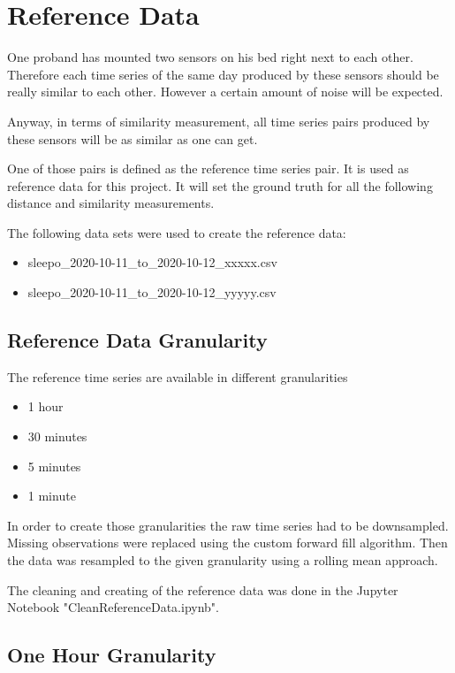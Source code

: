 \chapter{Reference Data}

One proband has mounted two sensors on his bed right next to each other. Therefore each time series of the same day produced by these sensors should be really similar to each other. However a certain amount of noise will be expected. 

Anyway, in terms of similarity measurement, all time series pairs produced by these sensors will be as similar as one can get.

One of those pairs is defined as the reference time series pair. It is used as reference data for this project. It will set the ground truth for all the following distance and similarity measurements.

The following data sets were used to create the reference data:

\begin{itemize}
  \item sleepo\_2020-10-11\_to\_2020-10-12\_xxxxx.csv
  \item sleepo\_2020-10-11\_to\_2020-10-12\_yyyyy.csv
\end{itemize}



\section{Reference Data Granularity}
The reference time series are available in different granularities

\begin{itemize}
  \item 1 hour
  \item 30 minutes
  \item 5 minutes
  \item 1 minute
\end{itemize}

In order to create those granularities the raw time series had to be downsampled.
Missing observations were replaced using the custom forward fill algorithm. Then the data was resampled to the given granularity using a rolling mean approach.

The cleaning and creating of the reference data was done in the Jupyter Notebook "CleanReferenceData.ipynb".


\section{One Hour Granularity}

